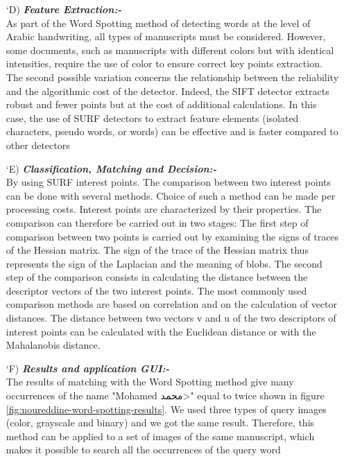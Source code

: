 \begin{itemize}[labelindent=1em,labelsep=0.25cm,leftmargin=*]
        \item[\char `D)] \textit{\textbf{Feature Extraction:-}} \\
        As part of the Word Spotting method of detecting words at the level of Arabic handwriting, all types of manuscripts must be considered. However, some documents, such as manuscripts with different colors but with identical intensities, require the use of color to ensure correct key points extraction. The second possible variation concerns the relationship between the reliability and the algorithmic cost of the detector. Indeed, the SIFT detector extracts robust and fewer points but at the cost of additional calculations. In this case, the use of SURF detectors to extract feature elements (isolated characters, pseudo words, or words) can be effective and is faster compared to other detectors
        
        \item[\char `E)] \textit{\textbf{Classification, Matching and Decision:-}} \\
        By using SURF interest points. The comparison between two interest points can be done with several methods. Choice of such a method can be made per processing costs. Interest points are characterized by their properties. The comparison can therefore be carried out in two stages: The first step of comparison between two points is carried out by examining the signs of traces of the Hessian matrix. The sign of the trace of the Hessian matrix thus represents the sign of the Laplacian and the meaning of blobs. The second step of the comparison consists in calculating the distance between the descriptor vectors of the two interest points. The most commonly used comparison methods are based on correlation and on the calculation of vector distances. The distance between two vectors v and u of the two descriptors of interest points can be calculated with the Euclidean distance or with the Mahalanobis distance.
        \item[\char `F)] \textit{\textbf{Results and application GUI:-}} \\
        The results of matching with the Word Spotting method give many occurrences of the name "Mohamed \<محمد>" equal to twice shown in figure \ref{fig:noureddine-word-spotting-results}. We used three types of query images (color, grayscale and binary) and we got the same result. Therefore, this method can be applied to a set of images of the same manuscript, which makes it possible to search all the occurrences of the query word


\end{itemize}
